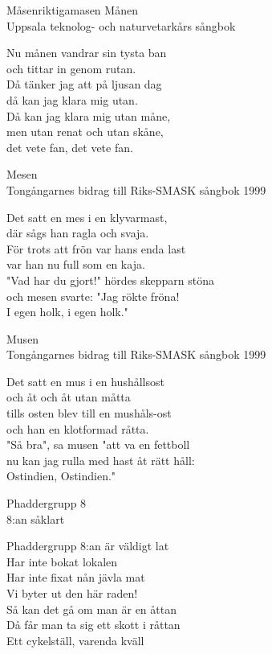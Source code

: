 \begin{song}{Måsen}{riktigamasen}
  {\Large Månen}\\{\tiny  Uppsala teknolog- och naturvetarkårs sångbok}
  \begin{vers}
Nu månen vandrar sin tysta ban \\
och tittar in genom rutan. \\
Då tänker jag att på ljusan dag \\
då kan jag klara mig utan. \\
Då kan jag klara mig utan måne, \\
men utan renat och utan skåne, \\
det vete fan, det vete fan. \\
\end{vers}
 

\newpage
 {\Large Mesen}\\{\tiny  Tongångarnes bidrag till Riks-SMASK sångbok 1999}
  \begin{vers}
Det satt en mes i en klyvarmast, \\
där sågs han ragla och svaja. \\
För trots att frön var hans enda last \\
var han nu full som en kaja. \\
"Vad har du gjort!" hördes skepparn stöna \\
och mesen svarte: "Jag rökte fröna! \\
I egen holk, i egen holk." \\
\end{vers}
 

  {\Large Musen}\\{\tiny  Tongångarnes bidrag till Riks-SMASK sångbok 1999}
  \begin{vers}
Det satt en mus i en hushållsost \\
och åt och åt utan måtta \\
tills osten blev till en mushåls-ost \\
och han en klotformad råtta. \\
"Så bra", sa musen "att va en fettboll \\
nu kan jag rulla med hast åt rätt håll:\\ 
Ostindien, Ostindien."\\ 
\end{vers}
 

  {\Large Phaddergrupp 8}\\{\tiny  8:an såklart}
  \begin{vers}
Phaddergrupp 8:an är väldigt lat\\
Har inte bokat lokalen\\
Har inte fixat nån jävla mat\\
Vi byter ut den här raden!\\
Så kan det gå om man är en åttan\\
Då får man ta sig ett skott i råttan\\
Ett cykelställ, varenda kväll\\
\end{vers}
 


\end{song}
